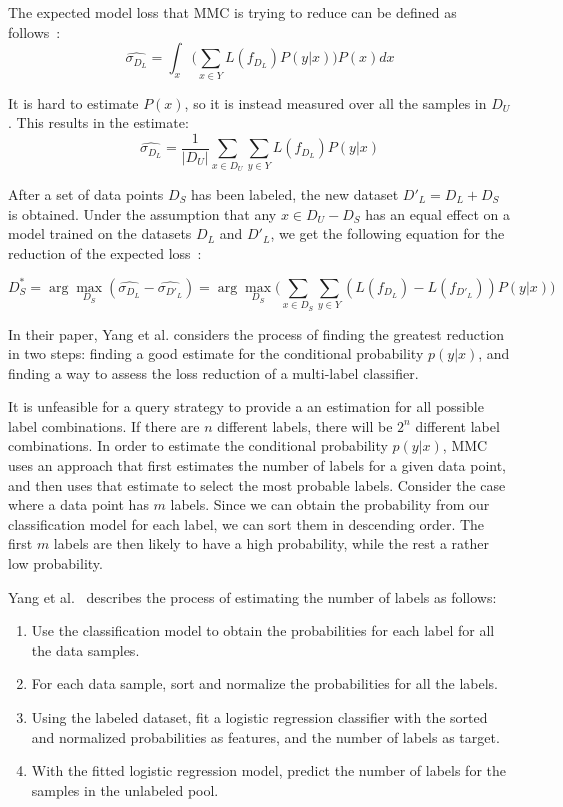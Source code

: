 The expected model loss that MMC is trying to reduce can be defined as follows~\cite{yang2009effective}:
\begin{equation}
    \widehat{\sigma_{D_L}} = \int_x \bigg ( \sum_{x \in Y} L(f_{D_L})P(y|x) \bigg ) P(x)dx
\end{equation}

It is hard to estimate $P(x)$, so it is instead measured over all the samples in $D_U$.
This results in the estimate:
\begin{equation}
    \widehat{\sigma_{D_L}} = \frac{1}{|D_U|} \sum_{x \in D_U} \sum_{y \in Y} L(f_{D_L})P(y|x)
\end{equation}

After a set of data points $D_S$ has been labeled, the new dataset $D'_L=D_L + D_S$ is obtained.
Under the assumption that any $x \in D_U - D_S$ has an equal effect on a model trained on the datasets $D_L$ and $D'_L$, we get the following equation for the reduction of the expected loss~\cite{yang2009effective}:

\begin{equation}
    D^*_S = \arg\max_{D_S}(\widehat{\sigma_{D_L}} - \widehat{\sigma_{D'_L}}) = \arg\max_{D_S} \big ( \sum_{x \in D_S} \sum_{y \in Y} (L(f_{D_L}) - L(f_{D'_L})) P(y|x) \big )
\end{equation}

In their paper, Yang et al\@. considers the process of finding the greatest reduction in two steps: finding a good estimate for the conditional probability $p(y|x)$, and finding a way to assess the loss reduction of a multi-label classifier.

It is unfeasible for a query strategy to provide a an estimation for all possible label combinations.
If there are $n$ different labels, there will be $2^n$ different label combinations.
In order to estimate the conditional probability $p(y|x)$, MMC uses an approach that first estimates the number of labels for a given data point, and then uses that estimate to select the most probable labels.
Consider the case where a data point has $m$ labels.
Since we can obtain the probability from our classification model for each label, we can sort them in descending order.
The first $m$ labels are then likely to have a high probability, while the rest a rather low probability.

Yang et al\@.~\cite{yang2009effective} describes the process of estimating the number of labels as follows:
\begin{enumerate}
    \item Use the classification model to obtain the probabilities for each label for all the data samples.
    \item For each data sample, sort and normalize the probabilities for all the labels.
    \item Using the labeled dataset, fit a logistic regression classifier with the sorted and normalized probabilities as features, and the number of labels as target.
    \item With the fitted logistic regression model, predict the number of labels for the samples in the unlabeled pool.
\end{enumerate}

